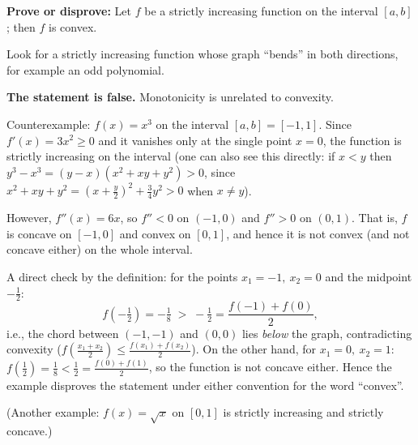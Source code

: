 
\begin{question}
\textbf{Prove or disprove:} Let $f$ be a strictly increasing function on the interval $[a,b]$; then $f$ is convex.
\end{question}

\begin{hint}
Look for a strictly increasing function whose graph ``bends'' in both directions, for example an odd polynomial.
\end{hint}

\begin{solution}
\textbf{The statement is false.} Monotonicity is unrelated to convexity.

Counterexample: $f(x)=x^3$ on the interval $[a,b]=[-1,1]$. Since $f'(x)=3x^2\ge 0$ and it vanishes only at the single point $x=0$, the function is strictly increasing on the interval (one can also see this directly: if $x<y$ then $y^3-x^3=(y-x)(x^2+xy+y^2)>0$, since $x^2+xy+y^2=(x+\tfrac y2)^2+\tfrac34y^2>0$ when $x\ne y$).

However, $f''(x)=6x$, so $f''<0$ on $(-1,0)$ and $f''>0$ on $(0,1)$. That is, $f$ is concave on $[-1,0]$ and convex on $[0,1]$, and hence it is not convex (and not concave either) on the whole interval.

A direct check by the definition: for the points $x_1=-1,\ x_2=0$ and the midpoint $-\tfrac12$:
\[ f\!\left(-\tfrac12\right)=-\tfrac18 \;>\; -\tfrac12=\frac{f(-1)+f(0)}{2}, \]
i.e., the chord between $(-1,-1)$ and $(0,0)$ lies \emph{below} the graph, contradicting convexity ($f(\tfrac{x_1+x_2}{2})\le \tfrac{f(x_1)+f(x_2)}{2}$). On the other hand, for $x_1=0,\ x_2=1$: $f(\tfrac12)=\tfrac18<\tfrac12=\tfrac{f(0)+f(1)}2$, so the function is not concave either. Hence the example disproves the statement under either convention for the word ``convex''.

(Another example: $f(x)=\sqrt{x}$ on $[0,1]$ is strictly increasing and strictly concave.)
\end{solution}
